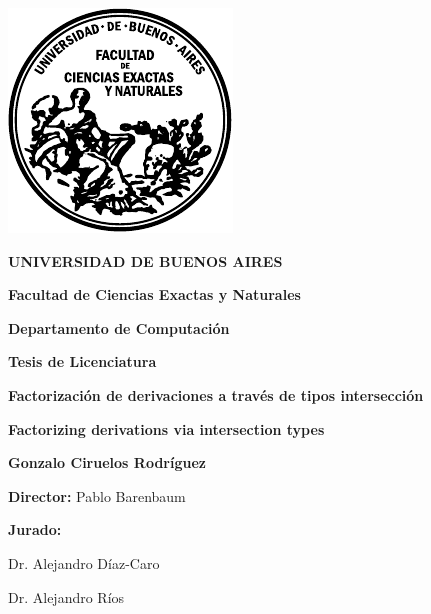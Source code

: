 
\thispagestyle{empty}

\begin {center}

\includegraphics[scale=.4,natwidth=100,natheight=100]{template_tesis/logofcen.pdf}

\medskip
\textbf{UNIVERSIDAD DE BUENOS AIRES}

\smallskip

\textbf{Facultad de Ciencias Exactas y Naturales}

\smallskip

\textbf{Departamento de Computaci\'on}

\vspace{3.5cm}

\textbf{\large Tesis de Licenciatura}


\vspace{1.5cm}

\textbf{\Large Factorizaci\'on de derivaciones a trav\'es de tipos intersecci\'on}

\textbf{\large Factorizing derivations via intersection types}

\vspace{1.5cm}


\textbf{\large Gonzalo Ciruelos Rodríguez}

\end {center}


\vspace{1.5cm}

\noindent \textbf{Director:} Pablo Barenbaum


\vspace{3cm}


\vspace{1cm}
\noindent
\textbf{Jurado:}

Dr. Alejandro Díaz-Caro

Dr. Alejandro Ríos
